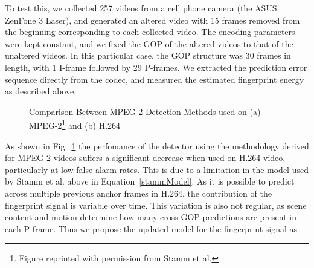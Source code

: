 To test this, we collected 257 videos from a cell phone camera (the ASUS ZenFone 3 Laser), and generated an altered video with 15 frames removed from the beginning corresponding to each collected video. The encoding parameters were kept constant, and we fixed the GOP of the altered videos to that of the unaltered videos. In this particular case, the GOP structure was 30 frames in length, with 1 I-frame followed by 29 P-frames. We extracted the prediction error sequence directly from the codec, and measured the estimated fingerprint energy as described above.

\begin{figure}[tbp]%
  \centering
  \qquad
\caption[Comparison Between MPEG-2 Detection Methods used on (a) MPEG-2 and (b) H.264]{Comparison Between MPEG-2 Detection Methods used on (a) MPEG-2\footnote{Figure reprinted with permission from Stamm et al.} and (b) H.264}%
\label{oldMethodCompare}%
\end{figure}


As shown in Fig.~\ref{oldMethodCompare} the perfomance of the detector using the methodology derived for MPEG-2 videos suffers a significant decrease when used on H.264 video, particularly at low false alarm rates. This is due to a limitation in the model used by Stamm et al. above in Equation~\ref{stammModel}. As it is possible to predict across multiple previous anchor frames in H.264, the contribution of the fingerprint signal is variable over time. This variation is also not regular, as scene content and motion determine how many cross GOP predictions are present in each P-frame. Thus we propose the updated model for the fingerprint signal as


